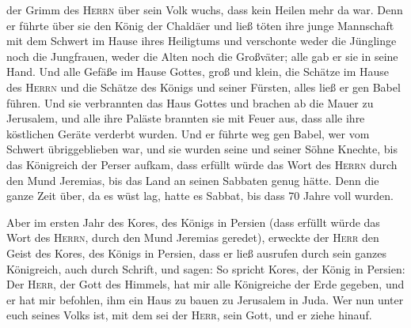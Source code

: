der Grimm des \textsc{Herrn} über sein Volk wuchs, dass kein Heilen mehr
da war.  Denn er führte über sie den König der Chaldäer
und ließ töten ihre junge Mannschaft mit dem Schwert im Hause ihres
Heiligtums und verschonte weder die Jünglinge noch die Jungfrauen, weder
die Alten noch die Großväter; alle gab er sie in seine Hand.
 Und alle Gefäße im Hause Gottes, groß und klein, die
Schätze im Hause des \textsc{Herrn} und die Schätze des Königs und
seiner Fürsten, alles ließ er gen Babel führen.  Und sie
verbrannten das Haus Gottes und brachen ab die Mauer zu Jerusalem, und
alle ihre Paläste brannten sie mit Feuer aus, dass alle ihre köstlichen
Geräte verderbt wurden.  Und er führte weg gen Babel, wer
vom Schwert übriggeblieben war, und sie wurden seine und seiner Söhne
Knechte, bis das Königreich der Perser aufkam,  dass
erfüllt würde das Wort des \textsc{Herrn} durch den Mund Jeremias, bis
das Land an seinen Sabbaten genug hätte. Denn die ganze Zeit über, da es
wüst lag, hatte es Sabbat, bis dass 70 Jahre voll wurden.

 Aber im ersten Jahr des Kores, des Königs in Persien
(dass erfüllt würde das Wort des \textsc{Herrn}, durch den Mund Jeremias
geredet), erweckte der \textsc{Herr} den Geist des Kores, des Königs in
Persien, dass er ließ ausrufen durch sein ganzes Königreich, auch durch
Schrift, und sagen:  So spricht Kores, der König in
Persien: Der \textsc{Herr}, der Gott des Himmels, hat mir alle
Königreiche der Erde gegeben, und er hat mir befohlen, ihm ein Haus zu
bauen zu Jerusalem in Juda. Wer nun unter euch seines Volks ist, mit dem
sei der \textsc{Herr}, sein Gott, und er ziehe hinauf.
